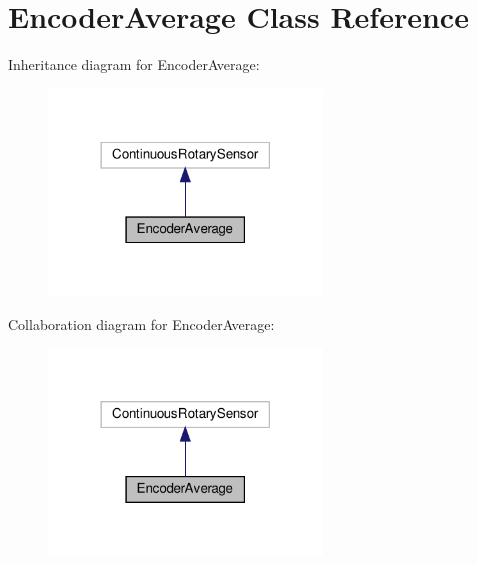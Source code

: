 \hypertarget{classEncoderAverage}{}\section{Encoder\+Average Class Reference}
\label{classEncoderAverage}


Inheritance diagram for Encoder\+Average\+:\nopagebreak
\begin{figure}[H]
\begin{center}
\leavevmode
\includegraphics[width=206pt]{classEncoderAverage__inherit__graph}
\end{center}
\end{figure}


Collaboration diagram for Encoder\+Average\+:\nopagebreak
\begin{figure}[H]
\begin{center}
\leavevmode
\includegraphics[width=206pt]{classEncoderAverage__coll__graph}
\end{center}
\end{figure}
